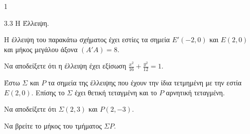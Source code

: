 \begin{ylh}{1}
    \item 3.3 Η Έλλειψη.
\end{ylh}
\begin{figure}
\centering
{}
\end{figure}

Η έλλειψη του παρακάτω σχήματος έχει εστίες τα σημεία $E'(-2,0)$ και $E(2,0)$ και μήκος μεγάλου άξονα $(A'A) = 8$.

\begin{alist}
\item Να αποδείξετε ότι η έλλειψη έχει εξίσωση $\frac{x^2}{16} + \frac{y^2}{12} = 1$. 
\item Έστω $\Sigma$ και $P$ τα σημεία της έλλειψης που έχουν την ίδια τετμημένη με την εστία $E(2,0)$.
Επίσης το $\Sigma$ έχει θετική τεταγμένη και το $P$ αρνητική τεταγμένη.
    \begin{rlist}
    \item Να αποδείξετε ότι $\Sigma(2, 3)$ και $P(2, -3)$. 
    \item Να βρείτε το μήκος του τμήματος $\Sigma P$. 
    \end{rlist}
\end{alist}